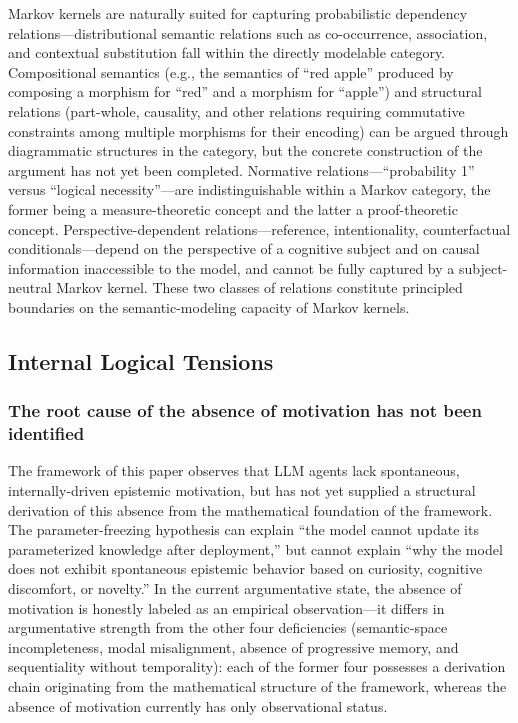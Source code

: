 \documentclass[11pt,a4paper]{article}
\theoremstyle{definition}
\begin{document}
Markov kernels are naturally suited for capturing probabilistic dependency relations---distributional semantic relations such as co-occurrence, association, and contextual substitution fall within the directly modelable category. Compositional semantics (e.g., the semantics of ``red apple'' produced by composing a morphism for ``red'' and a morphism for ``apple'') and structural relations (part-whole, causality, and other relations requiring commutative constraints among multiple morphisms for their encoding) can be argued through diagrammatic structures in the category, but the concrete construction of the argument has not yet been completed. Normative relations---``probability 1'' versus ``logical necessity''---are indistinguishable within a Markov category, the former being a measure-theoretic concept and the latter a proof-theoretic concept. Perspective-dependent relations---reference, intentionality, counterfactual conditionals---depend on the perspective of a cognitive subject and on causal information inaccessible to the model, and cannot be fully captured by a subject-neutral Markov kernel. These two classes of relations constitute principled boundaries on the semantic-modeling capacity of Markov kernels.

\subsection{Internal Logical Tensions}

\subsubsection{The root cause of the absence of motivation has not been identified}

The framework of this paper observes that LLM agents lack spontaneous, internally-driven epistemic motivation, but has not yet supplied a structural derivation of this absence from the mathematical foundation of the framework. The parameter-freezing hypothesis can explain ``the model cannot update its parameterized knowledge after deployment,'' but cannot explain ``why the model does not exhibit spontaneous epistemic behavior based on curiosity, cognitive discomfort, or novelty.'' In the current argumentative state, the absence of motivation is honestly labeled as an empirical observation---it differs in argumentative strength from the other four deficiencies (semantic-space incompleteness, modal misalignment, absence of progressive memory, and sequentiality without temporality): each of the former four possesses a derivation chain originating from the mathematical structure of the framework, whereas the absence of motivation currently has only observational status.
\end{document}
